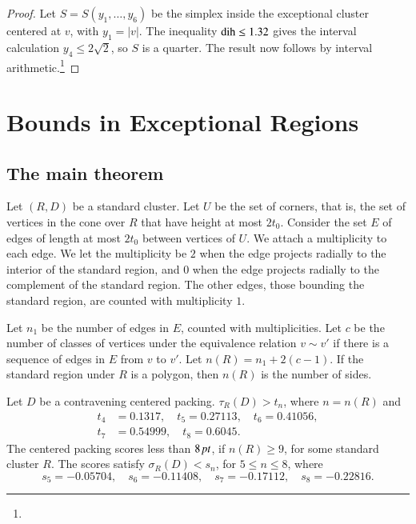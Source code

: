 \begin{proof} Let $S=S(y_1,\ldots,y_6)$ be the simplex inside the exceptional
cluster centered at $v$, with $y_1=|v|$. The inequality $\operatorname{dih}\le 1.32$
gives the interval calculation $y_4\le 2\sqrt{2}$, so $S$ is a quarter.
The result now follows by
interval arithmetic.\footnote{} %
\end{proof}


\chapter{Bounds in Exceptional Regions}%
    \label{sec:BER}






\section{The main theorem} %
    \label{sec:the-main-theorem}

Let $(R,D)$ be a standard cluster. Let $U$ be the set of corners,
that is, the set of vertices in the cone over $R$ that have height
at most $2t_0$.  Consider the set $E$ of edges of length at most
$2t_0$ between vertices of $U$. We attach a multiplicity to each
edge. We let the multiplicity be $2$ when the edge projects
radially to the interior of the standard region, and $0$ when the
edge projects radially to the complement of the standard region.
The other edges, those bounding the standard region, are counted
with multiplicity $1$.

Let $n_1$ be the number of edges in $E$, counted with multiplicities.
Let $c$ be the number of classes of vertices under the equivalence
relation $v\sim v'$ if there is a sequence of edges in $E$ from $v$ to
$v'$. Let $n(R)=n_1+2(c-1)$. If the standard region under $R$ is a
polygon, then $n(R)$ is the number of sides.

\begin{theorem}
    \label{thm:the-main-theorem}
    Let $D$ be a contravening centered packing.
$\tau_R(D) > t_n$, where $n=n(R)$ and
    $$
    \begin{array}{lll}
    t_4&=0.1317,\quad t_5=0.27113,\quad
    t_6=0.41056,\\
    t_7&=0.54999,\quad t_8=0.6045.
    \end{array}
    $$
The centered packing scores less than $8\,\hbox{\it pt}$, if $n(R)\ge 9$,
for some standard cluster $R$. The scores satisfy
$\sigma_R(D)<s_n$, for $5\le n\le 8$, where
    $$
    s_5=-0.05704,\quad s_6=-0.11408,\quad
    s_7=-0.17112,\quad s_8=-0.22816.
    $$
\end{theorem}

